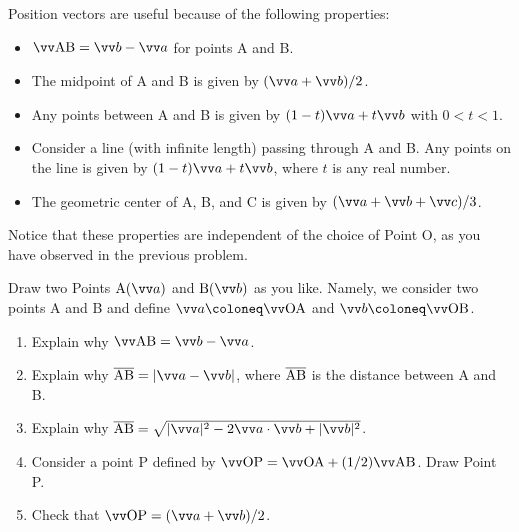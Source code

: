 \documentclass[11pt,pdfa,lastpage]{MishoNote}
\begin{document}
Position vectors are useful because of the following properties:
\begin{itemize}
  \item $\vvv{AB}=\vc b-\vc a$ for points A and B.
  \item The midpoint of A and B is given by $(\vc a+\vc b)/2$.
  \item Any points between A and B is given by $(1-t)\vc a+t\vc b$ with $0<t<1$.
  \item Consider a line (with infinite length) passing through A and B. Any points on the line is given by $(1-t)\vc a+t\vc b$, where $t$ is any real number.
  \item The geometric center of A, B, and C is given by $(\vc a+\vc b+\vc c)/3$.
\end{itemize}
Notice that these properties are independent of the choice of Point O, as you have observed in the previous problem.




\begin{quizzes}
  \Quiz[S] Draw two Points $\posvec Aa$ and $\posvec Bb$ as you like. Namely, we consider two points A and B and define $\vc a\coloneq\vvv{OA}$ and $\vc b\coloneq\vvv{OB}$.
  \begin{enumerate}
    \item Explain why $\vvv{AB}=\vc b-\vc a$.
    \item Explain why $\plen{AB}=|\vc a-\vc b|$, where $\overline{\mathrm{AB}}$ is the distance between A and B.
    \item Explain why $\plen{AB}=\sqrt{|\vc a|^2-2\vc a\cdot\vc b+|\vc b|^2}$.
    \item Consider a point P defined by $\vvv{OP}=\vvv{OA}+(1/2)\vvv{AB}$. Draw Point P.
    \item Check that $\vvv{OP}=(\vc a+\vc b)/2$.
  \end{enumerate}
  \end{quizzes}
\end{document}
